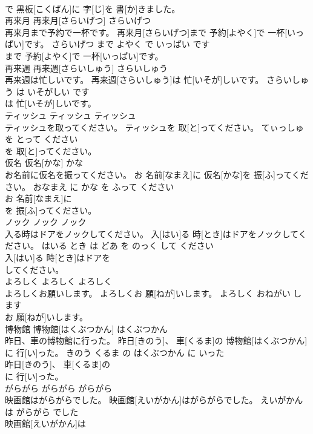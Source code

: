 \documentclass[8pt]{extreport}
\begin{document}
\begin{CJK}{UTF8}{min}
\\	で 黒板[こくばん]に 字[じ]を 書[か]きました。			
\\	再来月	再来月[さらいげつ]	さらいげつ	
\\	再来月まで予約で一杯です。	再来月[さらいげつ]まで 予約[よやく]で 一杯[いっぱい]です。	さらいげつ まで よやく で いっぱい です	
\\	まで 予約[よやく]で 一杯[いっぱい]です。			
\\	再来週	再来週[さらいしゅう]	さらいしゅう	
\\	再来週は忙しいです。	再来週[さらいしゅう]は 忙[いそが]しいです。	さらいしゅう は いそがしい です	
\\	は 忙[いそが]しいです。			
\\	ティッシュ	ティッシュ	ティッシュ	
\\	ティッシュを取ってください。	ティッシュを 取[と]ってください。	てぃっしゅ を とって ください	
\\	を 取[と]ってください。			
\\	仮名	仮名[かな]	かな	
\\	お名前に仮名を振ってください。	お 名前[なまえ]に 仮名[かな]を 振[ふ]ってください。	おなまえ に かな を ふって ください	
\\	お 名前[なまえ]に
\\	を 振[ふ]ってください。			
\\	ノック	ノック	ノック	
\\	入る時はドアをノックしてください。	入[はい]る 時[とき]はドアをノックしてください。	はいる とき は どあ を のっく して ください	
\\	入[はい]る 時[とき]はドアを
\\	してください。			
\\	よろしく	よろしく	よろしく	
\\	よろしくお願いします。	よろしくお 願[ねが]いします。	よろしく おねがい します	
\\	お 願[ねが]いします。			
\\	博物館	博物館[はくぶつかん]	はくぶつかん	
\\	昨日、車の博物館に行った。	昨日[きのう]、 車[くるま]の 博物館[はくぶつかん]に 行[い]った。	きのう くるま の はくぶつかん に いった	
\\	昨日[きのう]、 車[くるま]の
\\	に 行[い]った。			
\\	がらがら	がらがら	がらがら	
\\	映画館はがらがらでした。	映画館[えいがかん]はがらがらでした。	えいがかん は がらがら でした	
\\	映画館[えいがかん]は

\end{CJK}
\end{document}

